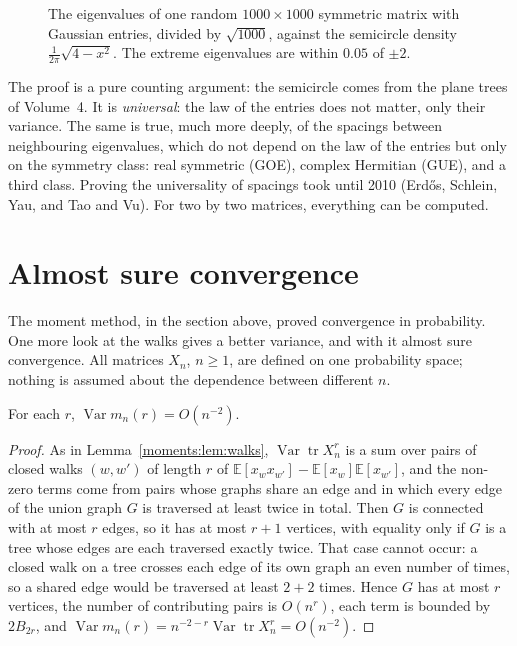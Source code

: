 \begin{figure}[ht]
\centering
{}
\caption{The eigenvalues of one random $1000\times1000$ symmetric matrix with Gaussian entries, divided by $\sqrt{1000}$, against the semicircle
density $\frac1{2\pi}\sqrt{4-x^2}$. The extreme eigenvalues are within $0.05$ of $\pm2$.}
\label{moments:fig:semicircle}
\end{figure}

The proof is a pure counting argument: the semicircle comes from the plane trees of Volume~4. It is \emph{universal}: the law of the entries does not
matter, only their variance. The same is true, much more deeply, of the spacings between neighbouring eigenvalues, which do not depend on the law of
the entries but only on the symmetry class: real symmetric (GOE), complex Hermitian (GUE), and a third class. Proving the universality of spacings
took until 2010 (Erd\H{o}s, Schlein, Yau, and Tao and Vu). For two by two matrices, everything can be computed.



\section{Almost sure convergence}

The moment method, in the section above, proved convergence in probability. One more look at the walks gives a better variance, and with it almost sure convergence. All matrices $X_n$, $n\ge1$, are defined on one probability space; nothing is assumed
about the dependence between different $n$.

\begin{proposition}\label{prop:varsharp}
For each $r$, $\operatorname{Var}m_n(r)=O(n^{-2})$.
\end{proposition}

\begin{proof}
As in Lemma~\ref{moments:lem:walks}, $\operatorname{Var}\operatorname{tr}X_n^r$ is a sum over pairs of closed walks $(w,w')$ of length $r$ of $\mathbb E[x_wx_{w'}]-\mathbb E[x_w]\mathbb E[x_{w'}]$, and the non-zero terms come from pairs whose graphs share an edge and
in which every edge of the union graph $G$ is traversed at least twice in total. Then $G$ is connected with at most $r$ edges, so it has at most $r+1$ vertices, with equality only if $G$ is a tree whose edges are each
traversed exactly twice. That case cannot occur: a closed walk on a tree crosses each edge of its own graph an even number of times, so a shared edge would be traversed at least $2+2$ times. Hence $G$ has at most $r$
vertices, the number of contributing pairs is $O(n^r)$, each term is bounded by $2B_{2r}$, and $\operatorname{Var}m_n(r)=n^{-2-r}\operatorname{Var}\operatorname{tr}X_n^r=O(n^{-2})$.
\end{proof}

